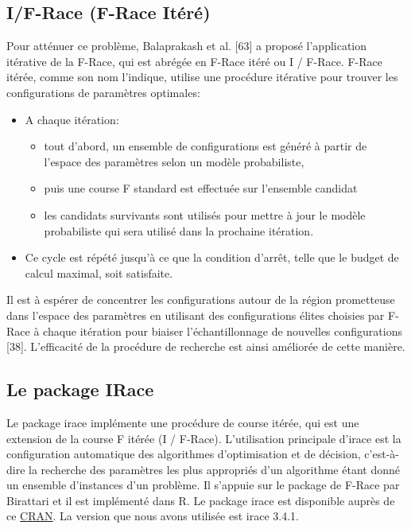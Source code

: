 \documentclass[12pt]{article}
\begin{document}
        \subsection{I/F-Race (F-Race Itéré)} 
            Pour atténuer ce problème, Balaprakash et al. [63] a proposé l'application itérative de la F-Race, qui est abrégée en F-Race itéré ou I / F-Race.
            F-Race itérée, comme son nom l'indique, utilise une procédure itérative pour trouver les configurations de paramètres optimales:
            \begin{itemize}
                \item A chaque itération:
                    \begin{itemize}
                        \item tout d'abord, un ensemble de configurations est généré à partir de l’espace des paramètres selon un modèle probabiliste,
                        \item puis une course F standard est effectuée sur l'ensemble candidat 
                        \item les candidats survivants sont utilisés pour mettre à jour le modèle probabiliste qui sera utilisé dans la prochaine itération.
                    \end{itemize}
                \item Ce cycle est répété jusqu'à ce que la condition d'arrêt, telle que le budget de calcul maximal, soit satisfaite.
            \end{itemize}
            Il est à espérer de concentrer les configurations autour de la région prometteuse dans l’espace des paramètres en utilisant des configurations élites choisies par F-Race à chaque itération pour biaiser l'échantillonnage de nouvelles configurations [38].  L'efficacité de la procédure de recherche est ainsi améliorée de cette manière.
        \subsection{Le package IRace}
        Le package irace implémente une procédure de course itérée, qui est une extension de la course F itérée (I / F-Race). L'utilisation principale d'irace est la configuration automatique des algorithmes d'optimisation et de décision, c'est-à-dire la recherche des paramètres les plus appropriés d'un algorithme étant donné un ensemble d’instances d'un problème. Il s'appuie sur le package de F-Race par Birattari et il est implémenté dans R. Le package irace est disponible auprès de ce \href{https://cran.r-project.org/package=irace}{CRAN}.
        La version que nous avons utilisée est irace 3.4.1.
\end{document}
